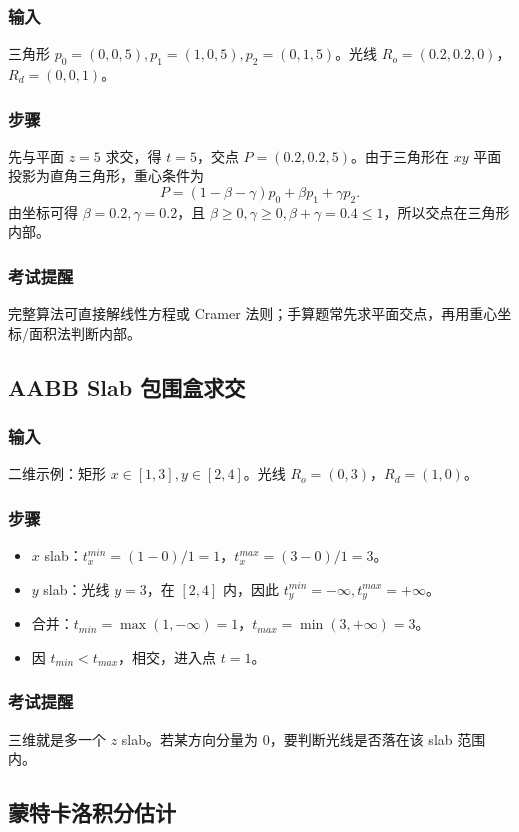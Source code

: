 \documentclass[UTF8,fontset=fandol,11pt]{ctexart}
\begin{document}
\subsubsection*{输入}
三角形 $p_0=(0,0,5),p_1=(1,0,5),p_2=(0,1,5)$。光线 $R_o=(0.2,0.2,0)$，$R_d=(0,0,1)$。
\subsubsection*{步骤}
先与平面 $z=5$ 求交，得 $t=5$，交点 $P=(0.2,0.2,5)$。由于三角形在 $xy$ 平面投影为直角三角形，重心条件为
\[
P=(1-\beta-\gamma)p_0+\beta p_1+\gamma p_2.
\]
由坐标可得 $\beta=0.2,\gamma=0.2$，且 $\beta\ge0,\gamma\ge0,\beta+\gamma=0.4\le1$，所以交点在三角形内部。
\subsubsection*{考试提醒}
完整算法可直接解线性方程或 Cramer 法则；手算题常先求平面交点，再用重心坐标/面积法判断内部。

\subsection{AABB Slab 包围盒求交}
\subsubsection*{输入}
二维示例：矩形 $x\in[1,3],y\in[2,4]$。光线 $R_o=(0,3)$，$R_d=(1,0)$。
\subsubsection*{步骤}
\begin{itemize}
  \item $x$ slab：$t_x^{min}=(1-0)/1=1$，$t_x^{max}=(3-0)/1=3$。
  \item $y$ slab：光线 $y=3$，在 $[2,4]$ 内，因此 $t_y^{min}=-\infty,t_y^{max}=+\infty$。
  \item 合并：$t_{min}=\max(1,-\infty)=1$，$t_{max}=\min(3,+\infty)=3$。
  \item 因 $t_{min}<t_{max}$，相交，进入点 $t=1$。
\end{itemize}
\subsubsection*{考试提醒}
三维就是多一个 $z$ slab。若某方向分量为 0，要判断光线是否落在该 slab 范围内。

\subsection{蒙特卡洛积分估计}
\end{document}
